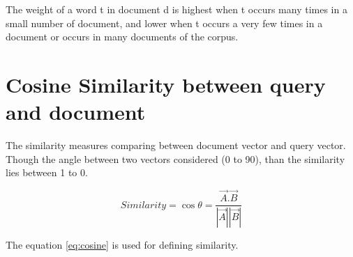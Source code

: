 
The weight of a word t in document d is highest when t occurs many times in a small number of document, and lower when t occurs a very few times in a document or occurs in many documents of the corpus.


\section{Cosine Similarity between query and document}

The similarity measures comparing between document vector and query vector. Though the angle between two vectors considered (0 to 90), than the similarity lies between 1 to 0.

\begin{equation}
Similarity = \cos\theta = \frac{\overrightarrow{A}.\overrightarrow{B}}{|\overrightarrow{A}||\overrightarrow{B}|}
\label{eq:cosine}
\end{equation}


The equation \ref{eq:cosine} is used for defining similarity.



